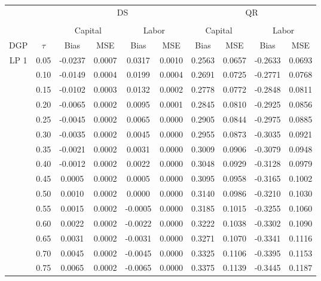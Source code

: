 \begin{table}[H]
\centering
\begin{tabular}{cccccccccc}
  \hline\hline & & & \multicolumn{2}{c}{DS} & & & \multicolumn{2}{c}{QR} \\ \cmidrule(lr){3-6} \cmidrule(lr){7-10} \\ & & \multicolumn{2}{c}{Capital} & \multicolumn{2}{c}{Labor} & \multicolumn{2}{c}{Capital} & \multicolumn{2}{c}{Labor} \\ \cmidrule(lr){3-4} \cmidrule(lr){5-6} \cmidrule(lr){7-8} \cmidrule(lr){9-10}DGP & $\tau$ & Bias & MSE & Bias & MSE & Bias & MSE & Bias & MSE \\ 
  \hline
LP 1 & 0.05 & -0.0237 & 0.0007 & 0.0317 & 0.0010 & 0.2563 & 0.0657 & -0.2633 & 0.0693 \\ 
   & 0.10 & -0.0149 & 0.0004 & 0.0199 & 0.0004 & 0.2691 & 0.0725 & -0.2771 & 0.0768 \\ 
   & 0.15 & -0.0102 & 0.0003 & 0.0132 & 0.0002 & 0.2778 & 0.0772 & -0.2848 & 0.0811 \\ 
   & 0.20 & -0.0065 & 0.0002 & 0.0095 & 0.0001 & 0.2845 & 0.0810 & -0.2925 & 0.0856 \\ 
   & 0.25 & -0.0045 & 0.0002 & 0.0065 & 0.0000 & 0.2905 & 0.0844 & -0.2975 & 0.0885 \\ 
   & 0.30 & -0.0035 & 0.0002 & 0.0045 & 0.0000 & 0.2955 & 0.0873 & -0.3035 & 0.0921 \\ 
   & 0.35 & -0.0021 & 0.0002 & 0.0031 & 0.0000 & 0.3009 & 0.0906 & -0.3079 & 0.0948 \\ 
   & 0.40 & -0.0012 & 0.0002 & 0.0022 & 0.0000 & 0.3048 & 0.0929 & -0.3128 & 0.0979 \\ 
   & 0.45 & 0.0005 & 0.0002 & 0.0005 & 0.0000 & 0.3095 & 0.0958 & -0.3165 & 0.1002 \\ 
   & 0.50 & 0.0010 & 0.0002 & 0.0000 & 0.0000 & 0.3140 & 0.0986 & -0.3210 & 0.1030 \\ 
   & 0.55 & 0.0015 & 0.0002 & -0.0005 & 0.0000 & 0.3185 & 0.1015 & -0.3255 & 0.1060 \\ 
   & 0.60 & 0.0022 & 0.0002 & -0.0022 & 0.0000 & 0.3222 & 0.1038 & -0.3302 & 0.1090 \\ 
   & 0.65 & 0.0031 & 0.0002 & -0.0031 & 0.0000 & 0.3271 & 0.1070 & -0.3341 & 0.1116 \\ 
   & 0.70 & 0.0045 & 0.0002 & -0.0045 & 0.0000 & 0.3325 & 0.1106 & -0.3395 & 0.1153 \\ 
   & 0.75 & 0.0065 & 0.0002 & -0.0065 & 0.0000 & 0.3375 & 0.1139 & -0.3445 & 0.1187 \\ 

\end{tabular}
\end{table}
